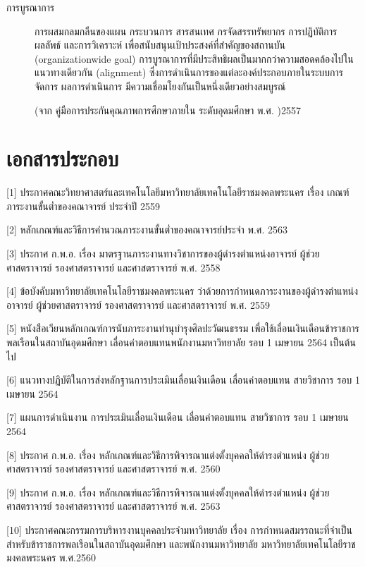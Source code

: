 \documentclass[a4paper,12pt,english]{sphinxmanual}
\begin{document}
\begin{description}
\item[{การบูรณาการ\label{\detokenize{glossary:term-11}}}] \leavevmode
การผสมกลมกลืนของแผน กระบวนการ สารสนเทศ กรจัดสรรทรัพยากร การปฏิบัติการ ผลลัพธ์ และการวิเคราะห์ เพื่อสนับสนุนเป้าประสงค์ที่สำคัญของสถานบัน (organization\sphinxhyphen{}wide goal) การบูรณาการที่มีประสิทธิผลเป็นมากกว่าความสอดคล้องไปในแนวทางเดียวกัน (alignment) ซึ่งการดำเนินการของแต่ละองค์ประกอบภายในระบบการจัดการ ผลการดำเนินการ มีความเชื่อมโยงกันเป็นหนึ่งเดียวอย่างสมบูรณ์

(จาก คู่มือการประกันคุณภาพการศึกษาภายใน ระดับอุดมศึกษา พ.ศ. )2557

\end{description}


\chapter{เอกสารประกอบ}
\label{\detokenize{official_documents:official-documents}}\label{\detokenize{official_documents:id1}}\label{\detokenize{official_documents::doc}}
  {[}1{]} ประกาศคณะวิทยาศาสตร์และเทคโนโลยีมหาวิทยาลัยเทคโนโลยีราชมงคลพระนคร เรื่อง เกณฑ์ภาระงานขั้นต่ำของคณาจารย์ ประจำปี 2559

{[}2{]} หลักเกณฑ์และวิธีการคำนวณภาระงานขั้นต่ำของคณาจารย์ประจำ พ.ศ. 2563

 {[}3{]} ประกาศ ก.พ.อ. เรื่อง มาตรฐานภาระงานทางวิชาการของผู้ดำรงตำแหน่งอาจารย์ ผู้ช่วยศาสตราจารย์ รองศาสตราจารย์ และศาสตราจารย์ พ.ศ. 2558

 {[}4{]} ข้อบังคับมหาวิทยาลัยเทคโนโลยีราชมงคลพระนคร ว่าด้วยการกำหนดภาระงานของผู้ดำรงตำแหน่งอาจารย์ ผู้ช่วยศาสตราจารย์ รองศาสตราจารย์ และศาสตราจารย์ พ.ศ. 2559

 {[}5{]} หนังสือเวียนหลักเกณฑ์การนับภาระงานทำนุบำรุงศิลปะวัฒนธรรม เพื่อใช้เลื่อนเงินเดือนข้าราชการพลเรือนในสถาบันอุดมศึกษา เลื่อนค่าตอบแทนพนักงานมหาวิทยาลัย รอบ 1 เมษายน 2564 เป็นต้นไป

 {[}6{]} แนวทางปฏิบัติในการส่งหลักฐานการประเมินเลื่อนเงินเดือน เลื่อนค่าตอบแทน สายวิชาการ รอบ 1 เมษายน 2564

{[}7{]} แผนการดำเนินงาน การประเมินเลื่อนเงินเดือน เลื่อนค่าตอบแทน สายวิชาการ รอบ 1 เมษายน 2564

{[}8{]} ประกาศ ก.พ.อ. เรื่อง หลักเกณฑ์และวิธีการพิจารณาแต่งตั้งบุคคลให้ดำรงตำแหน่ง ผู้ช่วยศาสตราจารย์ รองศาสตราจารย์ และศาสตราจารย์ พ.ศ. 2560

{[}9{]} ประกาศ ก.พ.อ. เรื่อง หลักเกณฑ์และวิธีการพิจารณาแต่งตั้งบุคคลให้ดำรงตำแหน่ง ผู้ช่วยศาสตราจารย์ รองศาสตราจารย์ และศาสตราจารย์ พ.ศ. 2563

{[}10{]} ประกาศคณะกรรมการบริหารงานบุคคลประจำมหาวิทยาลัย เรื่อง การกำหนดสมรรถนะที่จำเป็นสำหรับข้าราชการพลเรือนในสถาบันอุดมศึกษา และพนักงานมหาวิทยาลัย มหาวิทยาลัยเทคโนโลยีราชมงคลพระนคร พ.ศ.2560



\renewcommand{\indexname}{Index}
\printindex
\end{document}
